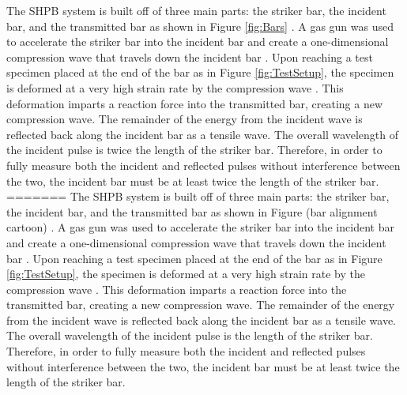 \documentclass[12pt]{article}
\begin{document}
The SHPB system is built off of three main parts: the striker bar, the incident bar, and the transmitted bar as shown in Figure \ref{fig:Bars} \cite{Frew2002} \cite{Follansbee} \cite{Frew}. A gas gun was used to accelerate the striker bar into the incident bar and create a one-dimensional compression wave that travels down the incident bar \cite{Frew}. Upon reaching a test specimen placed at the end of the bar as in Figure \ref{fig:TestSetup}, the specimen is deformed at a very high strain rate by the compression wave \cite{Dai}. This deformation imparts a reaction force into the transmitted bar, creating a new compression wave. The remainder of the energy from the incident wave is reflected back along the incident bar as a tensile wave. The overall wavelength of the incident pulse is twice the length of the  striker bar. Therefore, in order to fully measure both the incident and reflected pulses without interference between the two, the incident bar must be at least twice the length of the striker bar.
=======
The SHPB system is built off of three main parts: the striker bar, the incident bar, and the transmitted bar as shown in Figure (bar alignment cartoon) \cite{Frew2002} \cite{Follansbee} \cite{Frew}. A gas gun was used to accelerate the striker bar into the incident bar and create a one-dimensional compression wave that travels down the incident bar \cite{Frew}. Upon reaching a test specimen placed at the end of the bar as in Figure \ref{fig:TestSetup}, the specimen is deformed at a very high strain rate by the compression wave \cite{Dai}. This deformation imparts a reaction force into the transmitted bar, creating a new compression wave. The remainder of the energy from the incident wave is reflected back along the incident bar as a tensile wave. The overall wavelength of the incident pulse is the length of the striker bar. Therefore, in order to fully measure both the incident and reflected pulses without interference between the two, the incident bar must be at least twice the length of the striker bar.
\end{document}
